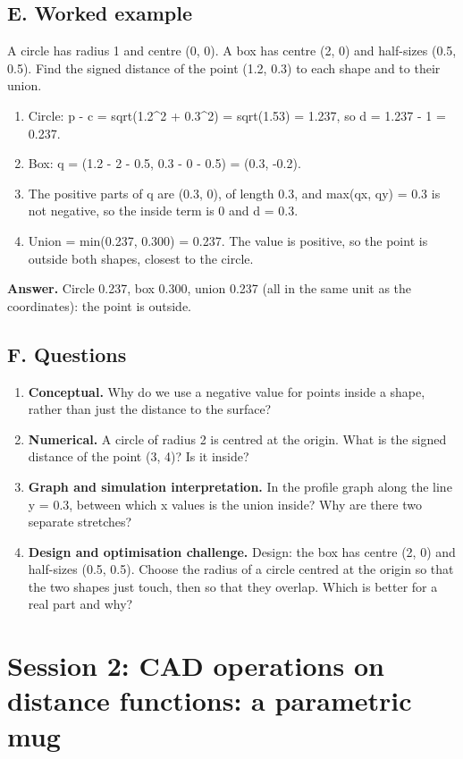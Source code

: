 \documentclass[11pt,a4paper]{article}
\begin{document}
\subsection*{E. Worked example}
A circle has radius 1 and centre (0, 0). A box has centre (2, 0) and half-sizes (0.5, 0.5). Find the signed distance of the point (1.2, 0.3) to each shape and to their union.
\begin{enumerate}[nosep]
\item Circle: \textbar{}p - c\textbar{} = sqrt(1.2\textasciicircum{}2 + 0.3\textasciicircum{}2) = sqrt(1.53) = 1.237, so d = 1.237 - 1 = 0.237.
\item Box: q = (\textbar{}1.2 - 2\textbar{} - 0.5, \textbar{}0.3 - 0\textbar{} - 0.5) = (0.3, -0.2).
\item The positive parts of q are (0.3, 0), of length 0.3, and max(qx, qy) = 0.3 is not negative, so the inside term is 0 and d = 0.3.
\item Union = min(0.237, 0.300) = 0.237. The value is positive, so the point is outside both shapes, closest to the circle.
\end{enumerate}
\textbf{Answer.} Circle 0.237, box 0.300, union 0.237 (all in the same unit as the coordinates): the point is outside.

\subsection*{F. Questions}
\begin{enumerate}[nosep]
\item \textbf{Conceptual.} Why do we use a negative value for points inside a shape, rather than just the distance to the surface?
\item \textbf{Numerical.} A circle of radius 2 is centred at the origin. What is the signed distance of the point (3, 4)? Is it inside?
\item \textbf{Graph and simulation interpretation.} In the profile graph along the line y = 0.3, between which x values is the union inside? Why are there two separate stretches?
\item \textbf{Design and optimisation challenge.} Design: the box has centre (2, 0) and half-sizes (0.5, 0.5). Choose the radius of a circle centred at the origin so that the two shapes just touch, then so that they overlap. Which is better for a real part and why?
\end{enumerate}

\section{Session 2: CAD operations on distance functions: a parametric mug}
\end{document}
